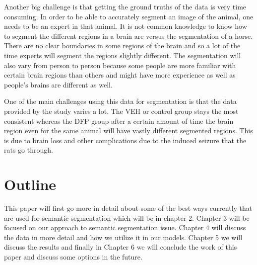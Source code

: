     Another big challenge is that getting the ground truths of the data is very time consuming. 
    In order to be able to accurately segment an image of the animal, one needs to be an expert in that animal. 
    It is not common knowledge to know how to segment the different regions in a brain are versus the segmentation of a horse.
    There are no clear boundaries in some regions of the brain and so a lot of the time experts will segment the regions slightly different. 
    The segmentation will also vary from person to person because some people are more familiar with certain brain regions than others and might have more experience as well as people's brains are different as well.
    
    One of the main challenges using this data for segmentation is that the data provided by the study varies a lot. 
    The VEH or control group stays the most consistent whereas the DFP group after a certain amount of time the brain region even for the same animal will have vastly different segmented regions.  
    This is due to brain loss and other complications due to the induced seizure that the rats go through.  
    
 

\section{Outline}
    This paper will first go more in detail about some of the best ways currently that are used for semantic segmentation which will be in chapter 2. 
    Chapter 3 will be focused on our approach to semantic segmentation issue. 
    Chapter 4 will discuss the data in more detail and how we utilize it in our models. Chapter 5 we will discuss the results and finally in Chapter 6 we will conclude the work of this paper and discuss some options in the future.